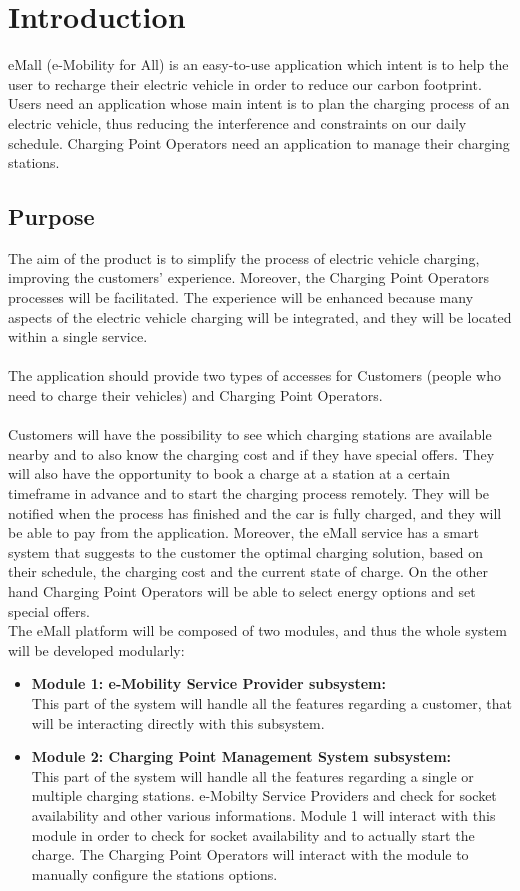 \section{Introduction}
eMall (e-Mobility for All) is an easy-to-use application which intent is to help the user to recharge their electric vehicle in order to reduce our carbon footprint.
Users need an application whose main intent is to plan the charging process of an electric vehicle, thus reducing the interference and constraints on our daily schedule.
Charging Point Operators need an application to manage their charging stations. 
\subsection{Purpose}

The aim of the product is to simplify the process of electric vehicle charging, improving the customers' experience. Moreover, the Charging Point Operators processes will be facilitated.
The experience will be enhanced because many aspects of the electric vehicle charging will be integrated, and they will be located within a single service.
\\\\
The application should provide two types of accesses for Customers (people who need to charge their vehicles) and Charging Point Operators.
\\\\
Customers will have the possibility to see which charging stations are available nearby and to also know the charging cost and if they have special offers.
They will also have the opportunity to book a charge at a station at a certain timeframe in advance and to start the charging process remotely.
They will be notified when the process has finished and the car is fully charged, and they will be able to pay from the application.
Moreover, the eMall service has a smart system that suggests to the customer the optimal charging solution, based on their schedule, the charging cost and the current state of charge.
On the other hand Charging Point Operators will be able to select energy options and set special offers.\\
The eMall platform will be composed of two modules, and thus the whole system will be developed modularly:
\begin{itemize}
        \item \textbf{Module 1: e-Mobility Service Provider subsystem:} 
        \\This part of the system will handle all the features regarding a customer, that will be interacting directly with this subsystem.
        \item \textbf{Module 2: Charging Point Management System subsystem:} 
        \\This part of the system will handle all the features regarding a single or multiple charging stations. e-Mobilty Service Providers and  check for socket availability and other various informations. Module 1 will interact with this module in order to check for socket availability and to actually start the charge. The Charging Point Operators will interact with the module to manually configure the stations options.
\end{itemize}

